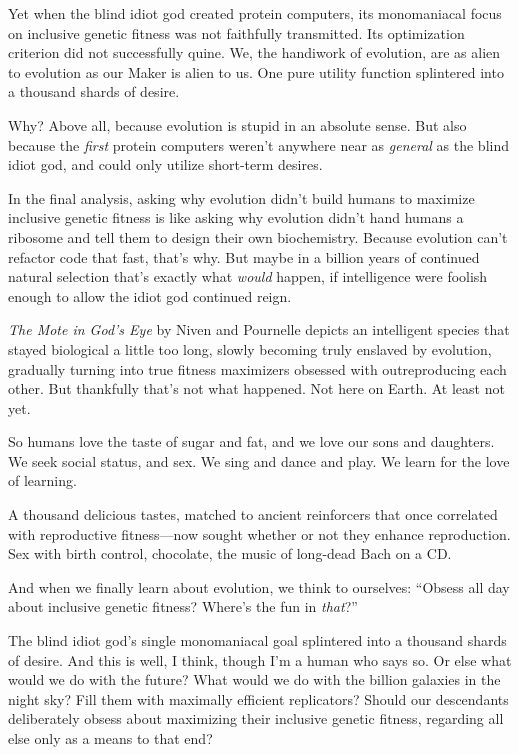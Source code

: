 {{
 Yet when the blind idiot god created protein computers, its
monomaniacal focus on inclusive genetic fitness was not faithfully
transmitted. Its optimization criterion did not successfully quine. We,
the handiwork of evolution, are as alien to evolution as our Maker is
alien to us. One pure utility function splintered into a thousand
shards of desire.}

{
 Why? Above all, because evolution is stupid in an absolute sense.
But also because the \textit{first} protein computers
weren't anywhere near as \textit{general} as the blind
idiot god, and could only utilize short-term desires.}

{
 In the final analysis, asking why evolution didn't
build humans to maximize inclusive genetic fitness is like asking why
evolution didn't hand humans a ribosome and tell them
to design their own biochemistry. Because evolution
can't refactor code that fast, that's
why. But maybe in a billion years of continued natural selection
that's exactly what \textit{would} happen, if
intelligence were foolish enough to allow the idiot god continued
reign.}

{
 \textit{The Mote in God's Eye} by Niven and
Pournelle depicts an intelligent species that stayed biological a
little too long, slowly becoming truly enslaved by evolution, gradually
turning into true fitness maximizers obsessed with outreproducing each
other. But thankfully that's not what happened. Not
here on Earth. At least not yet.}

{
 So humans love the taste of sugar and fat, and we love our sons
and daughters. We seek social status, and sex. We sing and dance and
play. We learn for the love of learning.}

{
 A thousand delicious tastes, matched to ancient reinforcers that
once correlated with reproductive fitness---now sought whether or not
they enhance reproduction. Sex with birth control, chocolate, the music
of long-dead Bach on a CD.}

{
 And when we finally learn about evolution, we think to ourselves:
``Obsess all day about inclusive genetic fitness?
Where's the fun in \textit{that}?''}

{
 The blind idiot god's single monomaniacal goal
splintered into a thousand shards of desire. And this is well, I think,
though I'm a human who says so. Or else what would we
do with the future? What would we do with the billion galaxies in the
night sky? Fill them with maximally efficient replicators? Should our
descendants deliberately obsess about maximizing their inclusive
genetic fitness, regarding all else only as a means to that end?}

}
